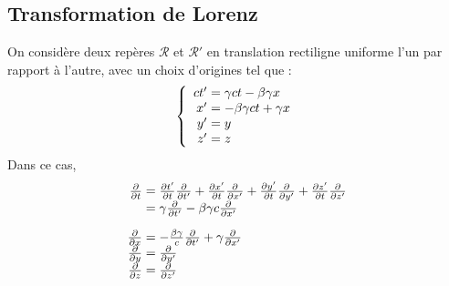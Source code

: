 \subsection{Transformation de Lorenz}
On considère deux repères $\mathcal{R}$ et $\mathcal{R}'$ en translation rectiligne uniforme l'un par rapport à l'autre, avec un choix d'origines tel que :
{\renewcommand*{\arraystretch}{1.2}
$$
	\left\{ \begin{array}{r@{\;}l}
		ct'&=\gamma ct-\beta\gamma x\\
		x'&=-\beta\gamma ct+\gamma x\\
		y'&=y\\
		z'&=z
	\end{array} \right.
$$}
Dans ce cas,
{\renewcommand*{\arraystretch}{2}
$$
	\begin{array}{r@{\;}l}
		\frac{\partial}{\partial t}&=\frac{\partial t'}{\partial t} \frac{\partial}{\partial t'}
				+\frac{\partial x'}{\partial t} \frac{\partial}{\partial x'}
				+\frac{\partial y'}{\partial t} \frac{\partial}{\partial y'}
				+\frac{\partial z'}{\partial t} \frac{\partial}{\partial z'}\\
			&=\gamma\frac{\partial}{\partial t'}-\beta\gamma c\frac{\partial}{\partial x'}\\[10pt]
		\frac{\partial}{\partial x}&=-\frac{\beta\gamma}{c}\frac{\partial}{\partial t'}+\gamma\frac{\partial}{\partial x'}\\
		\frac{\partial}{\partial y}&=\frac{\partial}{\partial y'}\\
		\frac{\partial}{\partial z}&=\frac{\partial}{\partial z'}
	\end{array}
$$}

